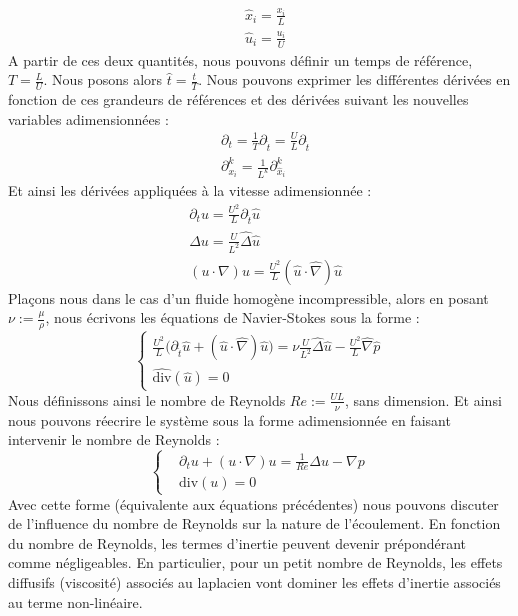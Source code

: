 \begin{align*}
    &\hat{x}_i = \frac{x_i}{L} \\
    &\hat{u}_i = \frac{u_i}{U}
\end{align*}
A partir de ces deux quantités, nous pouvons définir un temps de référence, $T = \frac{L}{U}$. Nous posons alors $\hat{t} = \frac{t}{T} $.
Nous pouvons exprimer les différentes dérivées en fonction de ces grandeurs de références et des dérivées suivant les nouvelles variables adimensionnées :
\begin{align*}
    &\partial_t = \frac{1}{T} \partial_{\hat{t}} = \frac{U}{L}\partial_{\hat{t}} \\
    &\partial_{x_i}^k = \frac{1}{L^k}\partial_{\hat{x}_i}^k
\end{align*}
Et ainsi les dérivées appliquées à la vitesse adimensionnée :
\begin{align*}
    &\partial_t u = \frac{U^2}{L}\partial_{\hat{t}}\hat{u} \\
    &\Delta u = \frac{U}{L^2} \hat{\Delta} \hat{u} \\
    &(u \cdot \nabla )u = \frac{U^2}{L}(\hat{u}\cdot \hat{\nabla})\hat{u}
\end{align*}
Plaçons nous dans le cas d'un fluide homogène incompressible, alors en posant $\nu := \frac{\mu}{\rho}$, nous écrivons les équations de Navier-Stokes sous la forme :
$$\begin{cases}
    \displaystyle \frac{U^2}{L}\big( \partial_{\hat{t}}\hat{u} + (\hat{u}\cdot \hat{\nabla})\hat{u} \big) = \nu \frac{U}{L^2}\hat{\Delta}\hat{u} -\frac{U^2}{L} \hat{\nabla} \hat{p} \\
    \widehat{\text{div}}(\hat{u}) = 0
\end{cases}$$
Nous définissons ainsi le nombre de Reynolds $Re := \frac{UL}{\nu}$, sans dimension. Et ainsi nous pouvons réecrire le système sous la forme adimensionnée en faisant intervenir le nombre de Reynolds :
$$\begin{cases}
    &\displaystyle \partial_t u + (u\cdot \nabla)u = \frac{1}{Re}\Delta u - \nabla p \\
    &\text{div}(u) = 0
\end{cases}$$
Avec cette forme (équivalente aux équations précédentes) nous pouvons discuter de l'influence du nombre de Reynolds sur la nature de l'écoulement. En fonction du nombre de Reynolds, les termes d'inertie peuvent devenir prépondérant comme négligeables.
En particulier, pour un petit nombre de Reynolds, les effets diffusifs (viscosité) associés au laplacien vont dominer les effets d'inertie associés au terme non-linéaire.
